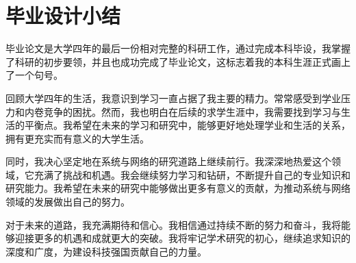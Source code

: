 \chapter*{毕业设计小结}

毕业论文是大学四年的最后一份相对完整的科研工作，通过完成本科毕设，我掌握了科研的初步要领，并且也成功完成了毕业论文，这标志着我的本科生涯正式画上了一个句号。

回顾大学四年的生活，我意识到学习一直占据了我主要的精力。常常感受到学业压力和内卷竞争的困扰。然而，我也明白在后续的求学生涯中，我需要找到学习与生活的平衡点。我希望在未来的学习和研究中，能够更好地处理学业和生活的关系，拥有更充实而有意义的大学生活。

同时，我决心坚定地在系统与网络的研究道路上继续前行。我深深地热爱这个领域，它充满了挑战和机遇。我会继续努力学习和钻研，不断提升自己的专业知识和研究能力。我希望在未来的研究中能够做出更多有意义的贡献，为推动系统与网络领域的发展做出自己的努力。

对于未来的道路，我充满期待和信心。我相信通过持续不断的努力和奋斗，我将能够迎接更多的机遇和成就更大的突破。我将牢记学术研究的初心，继续追求知识的深度和广度，为建设科技强国贡献自己的力量。

\clearpage
\endinput